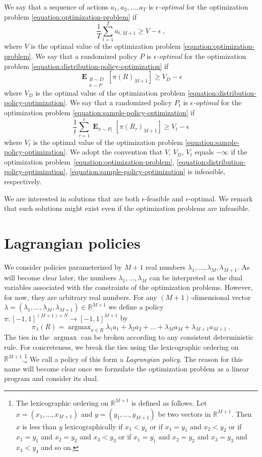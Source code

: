 \documentclass[12pt]{article}
\newcommand{\R}{\mathbb{R}}
\DeclareMathOperator*{\argmax}{argmax}
\DeclareMathOperator*{\Exp}{\mathbf{E}}
\theoremstyle{definition}
\begin{document}
We say that a sequence of actions $a_1, a_2, \dots, a_T$ is
\emph{$\epsilon$-optimal} for the optimization problem
\eqref{equation:optimization-problem} if
$$
\frac{1}{T} \sum_{t=1}^T a_{t,M+1} \ge V - \epsilon \: ,
$$
where $V$ is the optimal value of the optimization problem
\eqref{equation:optimization-problem}. We say that a randomized policy $P$ is
\emph{$\epsilon$-optimal} for the optimization problem
\eqref{equation:distribution-policy-optimization} if
$$
\Exp_{\substack{R \sim D \\ \pi \sim P}} \left[ \pi(R)_{M+1} \right] \ge V_D - \epsilon
$$
where $V_D$ is the optimal value of the optimization problem
\eqref{equation:distribution-policy-optimization}.
We say that a randomized
policy $P_t$ is \emph{$\epsilon$-optimal} for the optimization problem
\eqref{equation:sample-policy-optimization} if
$$
\frac{1}{t} \sum_{\tau=1}^t \Exp_{\pi \sim P_t} \left[ \pi(R_\tau)_{M+1} \right] \ge V_t - \epsilon
$$
where $V_t$ is the optimal value of the optimization problem
\eqref{equation:sample-policy-optimization}. We adopt the convention that $V$,
$V_D$, $V_t$ equals $-\infty$ if the optimization
problem~\eqref{equation:optimization-problem},
\eqref{equation:distribution-policy-optimization},
\eqref{equation:sample-policy-optimization} is infeasible, respectively.

We are interested in solutions that are both $\epsilon$-feasible and
$\epsilon$-optimal. We remark that such solutions might exist even if the
optimization problems are infeasible.

\section{Lagrangian policies}

We consider policies parameterized by $M+1$ real numbers $\lambda_1, \dots,
\lambda_M, \lambda_{M+1}$. As will become clear later, the numbers $\lambda_1,
\dots, \lambda_M$ can be interpreted as the dual variables associated with the
constraints of the optimization problems. However, for now, they are arbitrary
real numbers. For any $(M+1)$-dimensional vector $\lambda = (\lambda_1, \dots,
\lambda_M, \lambda_{M+1}) \in \R^{M+1}$ we define a policy $\pi:[-1,1]^{(M+1)
\times N} \to [-1,1]^{M+1}$ by
\begin{equation}
\label{equation:lagrangian-policy}
\pi_\lambda(R) = \argmax_{a \in R} \lambda_1 a_1 + \lambda_2 a_2 + \dots + \lambda_M a_M + \lambda_{M+1} a_{M+1} \: .
\end{equation}
The ties in the $\argmax$ can be broken according to any consistent
deterministic rule. For concreteness, we break the ties using the lexicographic
ordering on $\R^{M+1}$.\footnote{The lexicographic ordering on $\R^{M+1}$ is
defined as follows. Let $x = (x_1, \dots, x_{M+1})$ and $y = (y_1, \dots,
y_{M+1})$ be two vectors in $\R^{M+1}$. Then $x$ is less than $y$
lexicographically if $x_1 < y_1$ or if $x_1 = y_1$ and $x_2 < y_2$ or if $x_1 =
y_1$ and $x_2 = y_2$ and $x_3 < y_3$ or if $x_1 = y_1$ and $x_2 = y_2$ and $x_3
= y_3$ and $x_4 < y_4$ and so on.} We call a policy of this form a
\emph{Lagrangian policy}. The reason for this name will become clear once we
formulate the optimization problem as a linear program and consider its dual.
\end{document}
